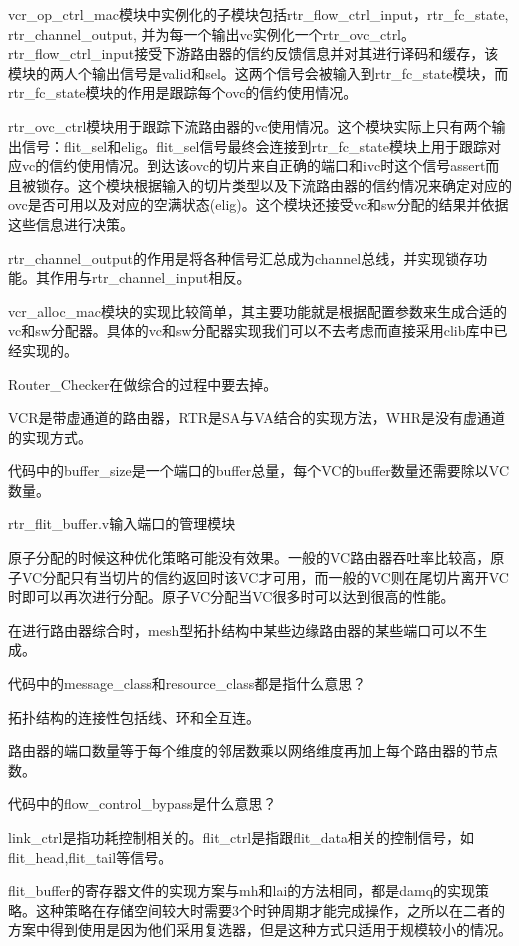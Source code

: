 ﻿\documentclass[10pt,journal]{IEEEtran}
\begin{document}
vcr\_op\_ctrl\_mac模块中实例化的子模块包括rtr\_flow\_ctrl\_input，rtr\_fc\_state, rtr\_channel\_output, 并为每一个输出vc实例化一个rtr\_ovc\_ctrl。rtr\_flow\_ctrl\_input接受下游路由器的信约反馈信息并对其进行译码和缓存，该模块的两人个输出信号是valid和sel。这两个信号会被输入到rtr\_fc\_state模块，而rtr\_fc\_state模块的作用是跟踪每个ovc的信约使用情况。

rtr\_ovc\_ctrl模块用于跟踪下流路由器的vc使用情况。这个模块实际上只有两个输出信号：flit\_sel和elig。flit\_sel信号最终会连接到rtr\_fc\_state模块上用于跟踪对应vc的信约使用情况。到达该ovc的切片来自正确的端口和ivc时这个信号assert而且被锁存。这个模块根据输入的切片类型以及下流路由器的信约情况来确定对应的ovc是否可用以及对应的空满状态(elig)。这个模块还接受vc和sw分配的结果并依据这些信息进行决策。

rtr\_channel\_output的作用是将各种信号汇总成为channel总线，并实现锁存功能。其作用与rtr\_channel\_input相反。

vcr\_alloc\_mac模块的实现比较简单，其主要功能就是根据配置参数来生成合适的vc和sw分配器。具体的vc和sw分配器实现我们可以不去考虑而直接采用clib库中已经实现的。

Router\_Checker在做综合的过程中要去掉。

VCR是带虚通道的路由器，RTR是SA与VA结合的实现方法，WHR是没有虚通道的实现方式。

代码中的buffer\_size是一个端口的buffer总量，每个VC的buffer数量还需要除以VC数量。

rtr\_flit\_buffer.v输入端口的管理模块

原子分配的时候这种优化策略可能没有效果。一般的VC路由器吞吐率比较高，原子VC分配只有当切片的信约返回时该VC才可用，而一般的VC则在尾切片离开VC时即可以再次进行分配。原子VC分配当VC很多时可以达到很高的性能。

在进行路由器综合时，mesh型拓扑结构中某些边缘路由器的某些端口可以不生成。

代码中的message\_class和resource\_class都是指什么意思？

拓扑结构的连接性包括线、环和全互连。

路由器的端口数量等于每个维度的邻居数乘以网络维度再加上每个路由器的节点数。

代码中的flow\_control\_bypass是什么意思？

link\_ctrl是指功耗控制相关的。flit\_ctrl是指跟flit\_data相关的控制信号，如flit\_head,flit\_tail等信号。

flit\_buffer的寄存器文件的实现方案与mh和lai的方法相同，都是damq的实现策略。这种策略在存储空间较大时需要3个时钟周期才能完成操作，之所以在二者的方案中得到使用是因为他们采用复选器，但是这种方式只适用于规模较小的情况。
\end{document}
